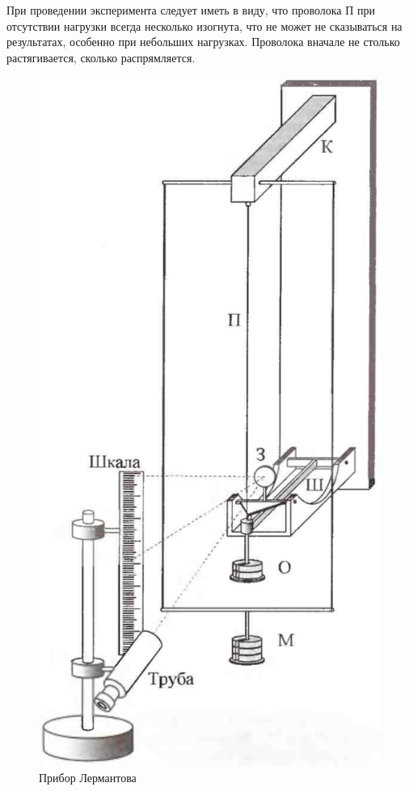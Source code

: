 \documentclass[a4paper,12pt]{article} %
\begin{document}
При проведении эксперимента следует иметь в виду, что проволока П при отсутствии нагрузки всегда несколько изогнута, что не может не сказываться на результатах, особенно при небольших нагрузках. Проволока вначале не столько растягивается, сколько распрямляется.
\newpage
\begin{figure}[h]
\centering
\includegraphics[scale=0.4]{1}
\caption{Прибор Лермантова}
\end{figure}
\end{document}
